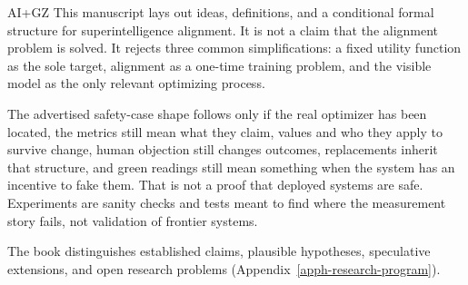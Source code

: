 
\begin{authbar}{AI+GZ}
This manuscript lays out ideas, definitions, and a conditional formal structure for superintelligence alignment.
It is not a claim that the alignment problem is solved.
It rejects three common simplifications: a fixed utility function as the sole target, alignment as a one-time training problem, and the visible model as the only relevant optimizing process.

The advertised safety-case shape follows only if the real optimizer has been located, the metrics still mean what they claim, values and who they apply to survive change, human objection still changes outcomes, replacements inherit that structure, and green readings still mean something when the system has an incentive to fake them.
That is not a proof that deployed systems are safe.
Experiments are sanity checks and tests meant to find where the measurement story fails, not validation of frontier systems.

The book distinguishes established claims, plausible hypotheses, speculative extensions, and open research problems (Appendix~\ref{apph-research-program}).
\end{authbar}
